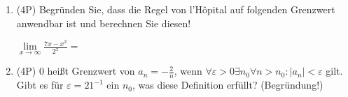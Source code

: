 \begin{enumerate}[label=(\alph*)]
		
	\item (4P) Begründen Sie, dass die Regel von l'Hôpital auf folgenden Grenzwert anwendbar ist und berechnen Sie diesen!
	
	$\lim\limits_{x \to\infty} \frac{7x-x^2}{2^x} = $
	
		\bigskip
		\bigskip
		\bigskip
		\bigskip
		\bigskip
		\bigskip
		\bigskip
		\bigskip
		\bigskip
		\bigskip
		\bigskip
		\bigskip
		\bigskip
		\bigskip
		\bigskip
		\bigskip
		\bigskip

	\item (4P) $0$ heißt Grenzwert von $a_n = -\frac{2}{n}$, wenn $\forall \varepsilon > 0 \exists n_0 \forall n > n_0: |a_n| < \varepsilon$ gilt. \\
	Gibt es für $\varepsilon = 21^{-1}$ ein $n_0$, was diese Definition erfüllt? (Begründung!)
		
\end{enumerate}
